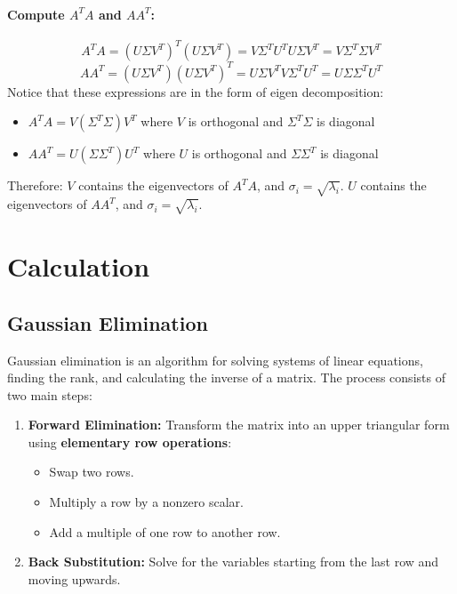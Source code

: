 \documentclass{article}
\begin{document}
\paragraph{Compute $A^T A$ and $AA^T$:}
\[
    A^T A = (U \Sigma V^T)^T (U \Sigma V^T) = V \Sigma^T U^T U \Sigma V^T = V \Sigma^T \Sigma V^T
\]
\[
    AA^T = (U \Sigma V^T)(U \Sigma V^T)^T = U \Sigma V^T V \Sigma^T U^T = U \Sigma \Sigma^T U^T
\]
Notice that these expressions are in the form of eigen decomposition:
\begin{itemize}
    \item $A^T A = V (\Sigma^T \Sigma) V^T$ where $V$ is orthogonal and $\Sigma^T \Sigma$ is diagonal
    \item $AA^T = U (\Sigma \Sigma^T) U^T$ where $U$ is orthogonal and $\Sigma \Sigma^T$ is diagonal
\end{itemize}
Therefore: $V$ contains the eigenvectors of $A^T A$, and $\sigma_i = \sqrt{\lambda_i}$. $U$ contains the eigenvectors of $AA^T$, and $\sigma_i = \sqrt{\lambda_i}$.


\newpage
\section{Calculation}

\subsection{Gaussian Elimination}
\label{subsec:gauss}

Gaussian elimination is an algorithm for solving systems of linear equations, finding the rank, and calculating the inverse of a matrix. The process consists of two main steps:

\begin{enumerate}
    \item \textbf{Forward Elimination:} Transform the matrix into an upper triangular form using \textbf{elementary row operations}:
    \begin{itemize}
        \item Swap two rows.
        \item Multiply a row by a nonzero scalar.
        \item Add a multiple of one row to another row.
    \end{itemize}
    \item \textbf{Back Substitution:} Solve for the variables starting from the last row and moving upwards.
\end{enumerate}
\end{document}
